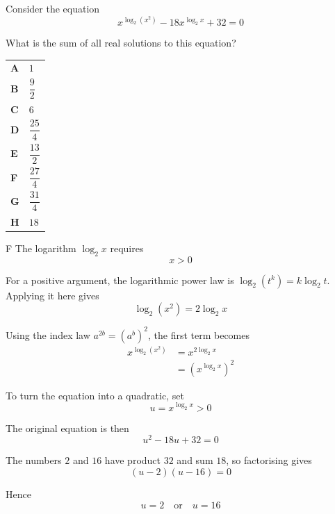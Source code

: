 \documentclass[11pt,a4paper]{article}
\begin{document}
\begin{enumerate}[label=\textbf{\arabic*.},leftmargin=*,itemsep=0pt,start=6]
Consider the equation
\[
x^{\log_2(x^2)} - 18 x^{\log_2 x} + 32 = 0
\]

What is the sum of all real solutions to this equation?

\par\vspace*{12pt}
\begin{tabularx}{\linewidth}{@{}>{\bfseries}l Y@{}}
A &
$1$
\\[0.8em]
B &
$\dfrac{9}{2}$
\\[0.8em]
C &
$6$
\\[0.8em]
D &
$\dfrac{25}{4}$
\\[0.8em]
E &
$\dfrac{13}{2}$
\\[0.8em]
F &
$\dfrac{27}{4}$
\\[0.8em]
G &
$\dfrac{31}{4}$
\\[0.8em]
H &
$18$
\\
\end{tabularx}

\begin{djsSolution}{F}
The logarithm $\log_2x$ requires
\[
x>0
\]

For a positive argument, the logarithmic power law is $\log_2(t^k)=k\log_2t$. Applying it here gives
\[
\log_2(x^2)=2\log_2x
\]

Using the index law $a^{2b}=(a^b)^2$, the first term becomes
\[
\begin{aligned}
x^{\log_2(x^2)}&=x^{2\log_2x}\\[5pt]
&=\left(x^{\log_2x}\right)^2
\end{aligned}
\]

To turn the equation into a quadratic, set
\[
u=x^{\log_2x}>0
\]

The original equation is then
\[
u^2-18u+32=0
\]

The numbers $2$ and $16$ have product $32$ and sum $18$, so factorising gives
\[
(u-2)(u-16)=0
\]

Hence
\[
u=2\quad\text{or}\quad u=16
\]


\end{djsSolution}
\end{enumerate}
\end{document}
